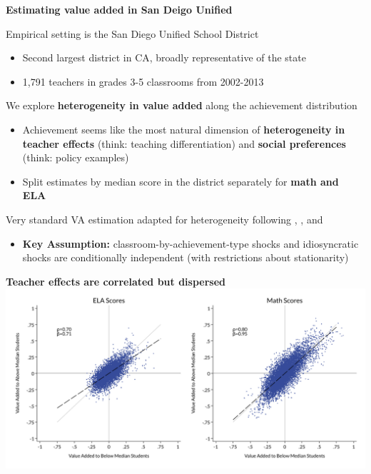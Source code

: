 \documentclass[t,aspectratio=169,11pt,presentation]{beamer}
\newenvironment{wideitemize}{\itemize\addtolength{\itemsep}{14pt}}{\enditemize}
\begin{document}
\begin{frame}[label=va]{\textbf{Estimating value added in San Deigo Unified}}
\begin{wideitemize}
    \item Empirical setting is the San Diego Unified School District
    \begin{itemize}
        \item Second largest district in CA, broadly representative of the state
        \item 1,791 teachers in grades 3-5 classrooms from 2002-2013
    \end{itemize}

    \item<2-> We explore \textbf{heterogeneity in value added} along the achievement distribution
    \begin{itemize}
        \item<3-> Achievement seems like the most natural dimension of \textbf{heterogeneity in teacher effects} (think: teaching differentiation) and \textbf{social preferences} (think: policy examples)
        \item<4-> Split estimates by median score in the district separately for \textbf{math and ELA}
    \end{itemize}
    

    \item<3-> Very standard VA estimation adapted for heterogeneity following \citet{chetty2014measuring1}, \citet{Delgado2020}, and \citet{bates2022teacher}
    
    \hyperlink{details}{}      
 \begin{itemize}
        \item<5-> \textbf{Key Assumption:} classroom-by-achievement-type shocks and idiosyncratic shocks are conditionally independent (with restrictions about stationarity)
    \end{itemize}


\end{wideitemize}
\end{frame}



\begin{frame}[c]{\textbf{Teacher effects are correlated but dispersed}}
\centering
 \includegraphics[width=.95\textwidth]{Working_Slides/WS_Figures/02a_VA.pdf}%
\end{frame}
\end{document}
